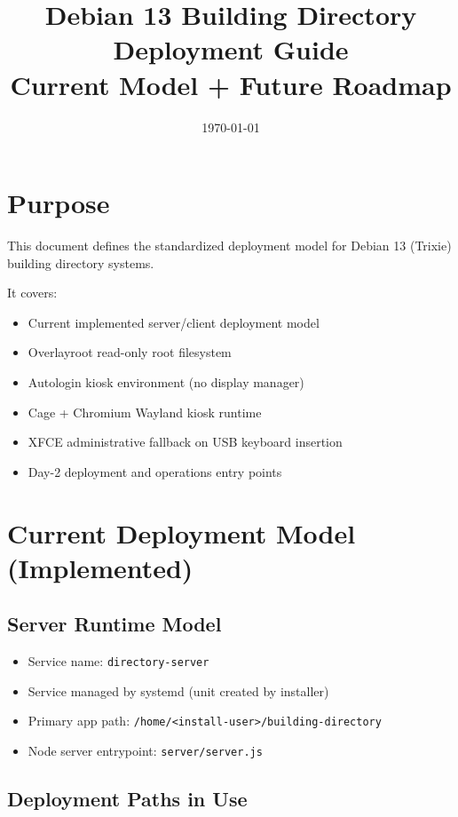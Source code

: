 \documentclass[11pt,letterpaper]{article}
\title{Debian 13 Building Directory Deployment Guide\\Current Model + Future Roadmap}
\author{}
\date{\today}
\begin{document}
\maketitle

\section*{Purpose}

This document defines the standardized deployment model for Debian 13 (Trixie) building directory systems.

It covers:

\begin{itemize}
\item Current implemented server/client deployment model
\item Overlayroot read-only root filesystem
\item Autologin kiosk environment (no display manager)
\item Cage + Chromium Wayland kiosk runtime
\item XFCE administrative fallback on USB keyboard insertion
\item Day-2 deployment and operations entry points
\end{itemize}

\section{Current Deployment Model (Implemented)}

\subsection{Server Runtime Model}

\begin{itemize}
\item Service name: \texttt{directory-server}
\item Service managed by systemd (unit created by installer)
\item Primary app path: \texttt{/home/<install-user>/building-directory}
\item Node server entrypoint: \texttt{server/server.js}
\end{itemize}

\subsection{Deployment Paths in Use}
\end{document}
